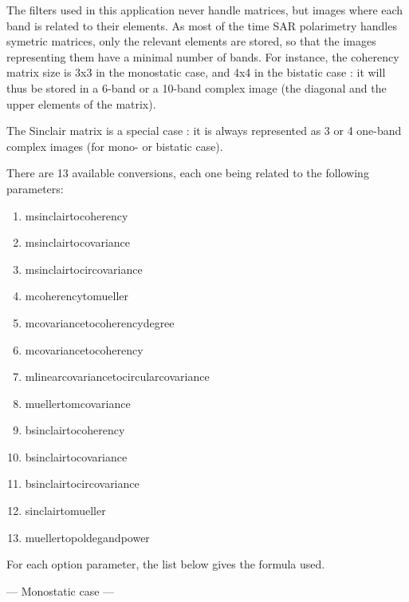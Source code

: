 The filters used in this application never handle matrices, but images where each band is related to their elements.
As most of the time SAR polarimetry handles symetric matrices, only the relevant elements are stored, so that the images representing them have a minimal number of bands.
For instance, the coherency matrix size is 3x3 in the monostatic case, and 4x4 in the bistatic case : it will thus be stored in a 6-band or a 10-band complex image (the diagonal and the upper elements of the matrix).

The Sinclair matrix is a special case : it is always represented as 3 or 4 one-band complex images (for mono- or bistatic case).

There are 13 available conversions, each one being related to the following  parameters:
\begin{enumerate}
\item msinclairtocoherency
\item msinclairtocovariance
\item msinclairtocircovariance
\item mcoherencytomueller
\item mcovariancetocoherencydegree
\item mcovariancetocoherency
\item mlinearcovariancetocircularcovariance
\item muellertomcovariance
\item bsinclairtocoherency
\item bsinclairtocovariance
\item bsinclairtocircovariance
\item sinclairtomueller
\item muellertopoldegandpower
\end{enumerate}

For each option parameter, the list below gives the formula used.

--- Monostatic case ---

